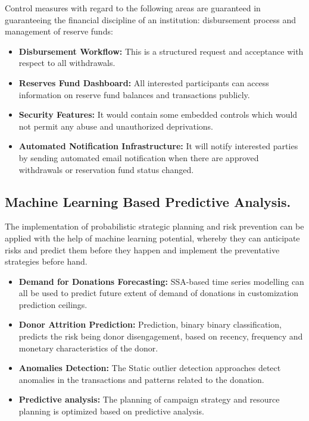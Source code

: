 \documentclass{thesis-library}
\begin{document}
Control measures with regard to the following areas are guaranteed in guaranteeing the financial discipline of an institution: disbursement process and management of reserve funds:

\begin{itemize}
    \item \textbf{Disbursement Workflow:} This is a structured request and acceptance with respect to all withdrawals.
    \item \textbf{Reserves Fund Dashboard:} All interested participants can access information on reserve fund balances and transactions publicly.
    \item \textbf{Security Features:} It would contain some embedded controls which would not permit any abuse and unauthorized deprivations.
    \item \textbf{Automated Notification Infrastructure:} It will notify interested parties by sending automated email notification when there are approved withdrawals or reservation fund status changed.
\end{itemize}

\subsection*{Machine Learning Based Predictive Analysis.}

The implementation of probabilistic strategic planning and risk prevention can be applied with the help of machine learning potential, whereby they can anticipate risks and predict them before they happen and implement the preventative strategies before hand.

\begin{itemize}
    \item \textbf{Demand for Donations Forecasting:} SSA-based time series modelling can all be used to predict future extent of demand of donations in customization prediction ceilings.
    \item \textbf{Donor Attrition Prediction:} Prediction, binary binary classification, predicts the risk being donor disengagement, based on recency, frequency and monetary characteristics of the donor.
    \item \textbf{Anomalies Detection:} The Static outlier detection approaches detect anomalies in the transactions and patterns related to the donation.
    \item \textbf{Predictive analysis:} The planning of campaign strategy and resource planning is optimized based on predictive analysis.
\end{itemize}
\end{document}
